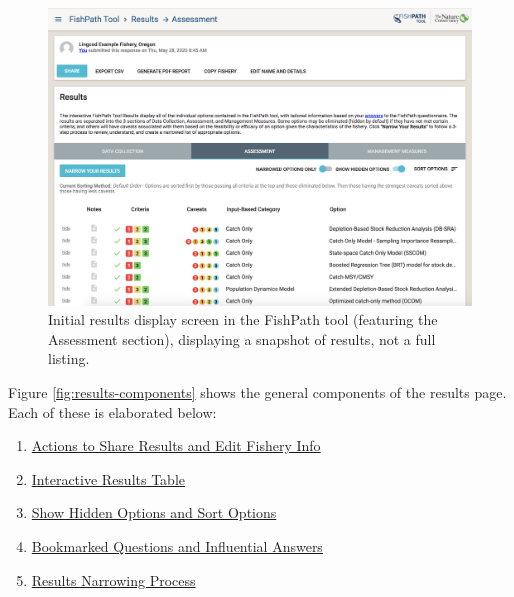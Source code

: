 \documentclass[
  11pt,
]{book}
\providecommand{\tightlist}{%
  \setlength{\itemsep}{0pt}\setlength{\parskip}{0pt}}
\begin{document}
\begin{figure}

{\centering \includegraphics[width=0.95\linewidth]{images/results-overview} 

}

\caption{Initial results display screen in the FishPath tool (featuring the Assessment section), displaying a snapshot of results, not a full listing.}\label{fig:results-overview}
\end{figure}

Figure \ref{fig:results-components} shows the general components of the results page. Each of these is elaborated below:

\begin{enumerate}
\def\labelenumi{\arabic{enumi}.}
\tightlist
\item
  \protect\hyperlink{Results-Actions}{Actions to Share Results and Edit Fishery Info}
\item
  \protect\hyperlink{interactive-results-table}{Interactive Results Table}
\item
  \protect\hyperlink{show-hidden-options-and-sort-options}{Show Hidden Options and Sort Options}
\item
  \protect\hyperlink{bookmarked-questions-and-influential-answers}{Bookmarked Questions and Influential Answers}
\item
  \protect\hyperlink{Results-Narrowing}{Results Narrowing Process}
\end{enumerate}
\end{document}
